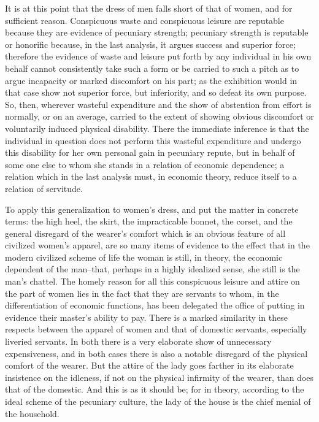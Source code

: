 \documentclass[12pt]{report}
\begin{document}
It is at this point that the dress of men falls short of that of women,
and for sufficient reason. Conspicuous waste and conspicuous leisure
are reputable because they are evidence of pecuniary strength; pecuniary
strength is reputable or honorific because, in the last analysis, it
argues success and superior force; therefore the evidence of waste
and leisure put forth by any individual in his own behalf cannot
consistently take such a form or be carried to such a pitch as to argue
incapacity or marked discomfort on his part; as the exhibition would in
that case show not superior force, but inferiority, and so defeat its
own purpose. So, then, wherever wasteful expenditure and the show of
abstention from effort is normally, or on an average, carried to the
extent of showing obvious discomfort or voluntarily induced physical
disability. There the immediate inference is that the individual in
question does not perform this wasteful expenditure and undergo this
disability for her own personal gain in pecuniary repute, but in
behalf of some one else to whom she stands in a relation of economic
dependence; a relation which in the last analysis must, in economic
theory, reduce itself to a relation of servitude.

To apply this generalization to women's dress, and put the matter in
concrete terms: the high heel, the skirt, the impracticable bonnet, the
corset, and the general disregard of the wearer's comfort which is an
obvious feature of all civilized women's apparel, are so many items of
evidence to the effect that in the modern civilized scheme of life the
woman is still, in theory, the economic dependent of the man--that,
perhaps in a highly idealized sense, she still is the man's chattel. The
homely reason for all this conspicuous leisure and attire on the part
of women lies in the fact that they are servants to whom, in the
differentiation of economic functions, has been delegated the office
of putting in evidence their master's ability to pay. There is a marked
similarity in these respects between the apparel of women and that of
domestic servants, especially liveried servants. In both there is a very
elaborate show of unnecessary expensiveness, and in both cases there is
also a notable disregard of the physical comfort of the wearer. But
the attire of the lady goes farther in its elaborate insistence on the
idleness, if not on the physical infirmity of the wearer, than does that
of the domestic. And this is as it should be; for in theory, according
to the ideal scheme of the pecuniary culture, the lady of the house is
the chief menial of the household.
\end{document}
